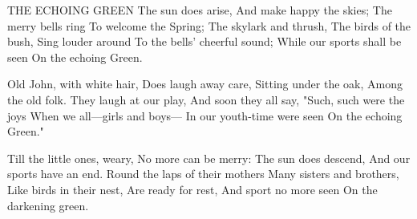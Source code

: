 THE ECHOING GREEN
   The sun does arise,
   And make happy the skies;
   The merry bells ring
   To welcome the Spring;
   The skylark and thrush,
   The birds of the bush,
   Sing louder around
   To the bells' cheerful sound;
   While our sports shall be seen
   On the echoing Green.

   Old John, with white hair,
   Does laugh away care,
   Sitting under the oak,
   Among the old folk.
   They laugh at our play,
   And soon they all say,
   "Such, such were the joys
   When we all—girls and boys—
   In our youth-time were seen
   On the echoing Green."
   
   Till the little ones, weary,
   No more can be merry:
   The sun does descend,
   And our sports have an end.
   Round the laps of their mothers
   Many sisters and brothers,
   Like birds in their nest,
   Are ready for rest,
   And sport no more seen
   On the darkening green.
